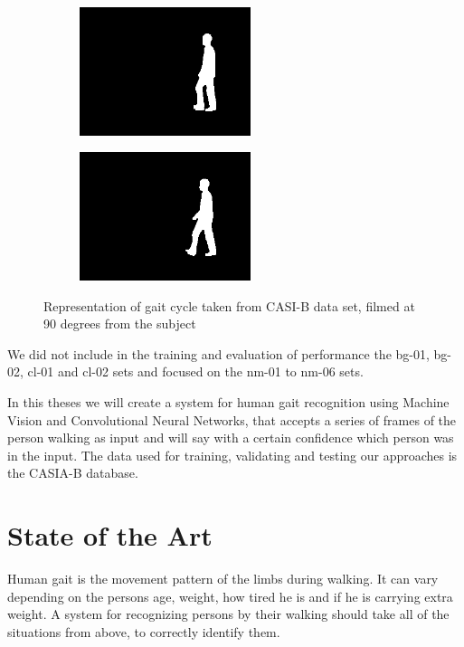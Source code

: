 \documentclass[12pt]{article}
\theoremstyle{definition}
\begin{document}
\begin{figure}[h]
		\vspace{0.5cm}
		\begin{subfigure}{6cm}
			\centering\includegraphics[width=5cm]{silhouettes/walk/001-nm-01-090-059.png}
			\caption{}
		\end{subfigure}
		\hspace{0.5cm}
		\begin{subfigure}{6cm}
			\centering\includegraphics[width=5cm]{silhouettes/walk/001-nm-01-090-060.png}
			\caption{}
		\end{subfigure}

		\caption{Representation of gait cycle taken from CASI-B data set, filmed at 90 degrees from the subject}
		\label{figure:gait-cycle}
	\end{figure}


	We did not include in the training and evaluation of performance the bg-01, bg-02, cl-01 and cl-02 sets and focused on the nm-01 to nm-06 sets.

	In this theses we will create a system for human gait recognition using Machine Vision and Convolutional Neural Networks, that accepts a series of frames of the person walking as input and will say with a certain confidence which person was in the input. The data used for training, validating and testing our approaches is the CASIA-B database.

	\clearpage

	\section{State of the Art}
	\vspace{1cm}

	Human gait is the movement pattern of the limbs during walking. It can vary depending on the persons age, weight, how tired he is and if he is carrying extra weight. A system for recognizing persons by their walking should take all of the situations from above, to correctly identify them.
\end{document}
